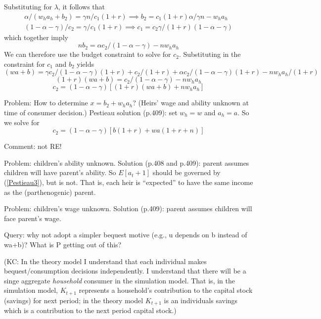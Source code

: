 \documentclass{article}
\begin{document}
Substituting for $\lambda$, it follows that
\begin{gather}
\alpha/(w_{h}a_{h}+b_{2}) = \gamma n/ c_{1} (1+r)
\implies
b_{2} = c_{1} (1+r)\alpha/ \gamma n - w_{h}a_{h}
\\
(1-\alpha-\gamma)/ c_{2} = \gamma / c_{1} (1+r)  \implies  c_{1} = c_{2}\gamma/(1+r) (1-\alpha-\gamma)
\end{gather}
which together imply
\begin{equation}
n b_{2} = \alpha c_{2} /(1-\alpha-\gamma)  - n w_{h} a_{h}
\end{equation}
We can therefore use the budget constraint to solve for $c_{2}$.
Substituting in the constraint for $c_{1}$ and $b_{2}$ yields
\begin{equation}
(w  a + b) = \gamma c_{2}/(1-\alpha-\gamma)(1+r) + c_{2}/(1+r) + \alpha c_{2}/(1-\alpha-\gamma)(1+r) - nw_{h}a_{h}/(1+r)
\end{equation}
\begin{equation}
(1+r)(w  a + b) = c_{2}/(1-\alpha-\gamma)  - nw_{h}a_{h}
\end{equation}
\begin{equation}
c_{2} = (1-\alpha-\gamma)[(1+r)(w  a + b)   + nw_{h}a_{h}]
\end{equation}

Problem: How to determine $x=b_{2}+w_{h}a_{h}$?
(Heirs' wage and ability unknown at time of consumer decision.)
Pestieau solution (p.409): set $w_{h}=w$ and $a_{h}=a$.
So we solve for
\begin{equation}
c_{2} = (1-\alpha-\gamma)[b(1+r) + wa(1+r+n)]
\end{equation}

Comment: not RE!

Problem: children's ability unknown.
Solution (p.408 and p.409): parent assumes children will have parent's ability.
So $E[a_t+1]$ should be governed by (\ref{Pestieau3}), but is not.
That is, each heir is ``expected'' to have the same income as the (parthenogenic) parent.

Problem: children's wage unknown.
Solution (p.409): parent assumes children will face parent's wage.

Query:
why not adopt a simpler bequest motive (e.g., u depends on b instead of wa+b)?
What is P getting out of this?

(KC: In the theory model I understand that each individual makes bequest/consumption decisions independently.  I understand that there will be a singe aggregate \emph{household} consumer in the simulation model.  That is, in the simulation model, $K_{t+1}$ represents a household's contribution to the capital stock (savings) for next period; in the theory model $K_{t+1}$ is an individuals savings which is a contribution to the next period capital stock.)\newline
\end{document}
